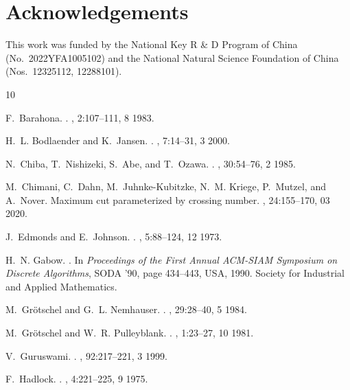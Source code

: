 \documentclass[10pt,fleqn]{article}
\begin{document}
	
		\section*{Acknowledgements}
	This work was funded by the National Key R \& D Program of China (No.~2022YFA1005102) and
the National Natural Science Foundation of China (Nos.~12325112, 12288101). 
	

\begin{thebibliography}{10}
	
	F.~Barahona.
	.
	, 2:107--111, 8 1983.
	
	H.~L. Bodlaender and K.~Jansen.
	.
	, 7:14–31, 3 2000.
	
	N.~Chiba, T.~Nishizeki, S.~Abe, and T.~Ozawa.
	.
	, 30:54–76, 2 1985.
	
	M.~Chimani, C.~Dahn, M.~Juhnke-Kubitzke, N.~M. Kriege, P.~Mutzel, and A.~Nover.
	\newblock Maximum cut parameterized by crossing number.
	, 24:155--170, 03 2020.
	
	J.~Edmonds and E.~Johnson.
	.
	, 5:88--124, 12 1973.
	
	H.~N. Gabow.
	.
	\newblock In {\em {Proceedings of the First Annual ACM-SIAM Symposium on
			Discrete Algorithms}}, SODA '90, page 434–443, USA, 1990. Society for
	Industrial and Applied Mathematics.
	
	M.~Gr\"{o}tschel and G.~L. Nemhauser.
	.
	, 29:28–40, 5 1984.
	
	M.~Gr\"{o}tschel and W.~R. Pulleyblank.
	.
	, 1:23--27, 10 1981.
	
	V.~Guruswami.
	.
	, 92:217–221, 3 1999.
	
	F.~Hadlock.
	.
	, 4:221--225, 9 1975.
	

\end{thebibliography}
\end{document}
